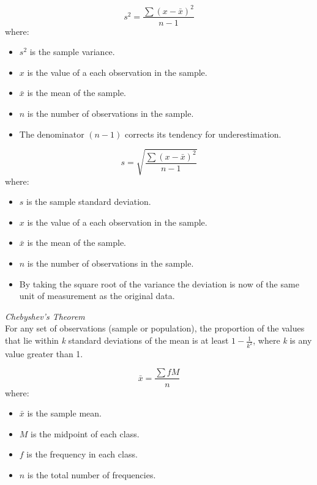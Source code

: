 \begin{equation}
\label{sample variance}
s^2 = \frac{\sum (x - \bar{x})^2}{n - 1}
\end{equation}
where:
\begin{itemize}
 \item $s^2$ is the sample variance.
 \item $x$ is the value of a each observation in the sample.
 \item $\bar{x}$ is the mean of the sample.
 \item $n$ is the number of observations in the sample.
 \item The denominator $(n -1)$ corrects its tendency for underestimation.
\end{itemize}
\hformbar 


\begin{equation}
\label{sample standard deviation}
s = \sqrt{\frac{\sum (x - \bar{x})^2}{n - 1}}
\end{equation}
where:
\begin{itemize}
 \item $s$ is the sample standard deviation.
 \item $x$ is the value of a each observation in the sample.
 \item $\bar{x}$ is the mean of the sample.
 \item $n$ is the number of observations in the sample.
 \item By taking the square root of the variance the deviation is now of the same unit of measurement as the original data.
\end{itemize}
\hformbar


\begin{equation}
\label{chebyshev's Theorem}
\end{equation}\textit{Chebyshev's Theorem}\\
For any set of observations (sample or population), the proportion of the values that lie within \emph{k} standard deviations of the mean is at least $1 - \frac{1}{k^2}$, where \emph{k} is any value greater than 1.
\hformbar


\begin{equation}
\label{arithmetic mean of grouped data}
\bar{x} = \frac{\sum{fM}}{n}
\end{equation}
where:
\begin{itemize}
 \item $\bar{x}$ is the sample mean.
 \item $M$ is the midpoint of each class.
 \item $f$ is the frequency in each class.
 \item $n$ is the total number of frequencies.
\end{itemize}
\hformbar


